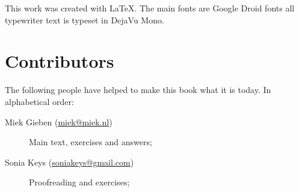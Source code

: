 This work was created with \LaTeX. The main fonts are Google Droid fonts all
typewriter text is typeset in DejaVu Mono.

\section{Contributors}
The following people have helped to make this book what it is today.
In alphabetical order:
\begin{description}
\item[Miek Gieben (\url{miek@miek.nl})] 
{Main text, exercises and answers;}
\item[Sonia Keys (\url{soniakeys@gmail.com})] 
{Proofreading and exercises;}
\end{description}
